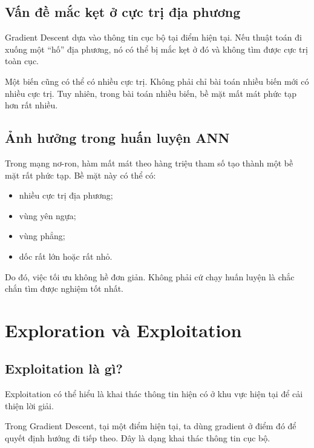 \documentclass[12pt,a4paper]{report}
\begin{document}
\section{Vấn đề mắc kẹt ở cực trị địa phương}

Gradient Descent dựa vào thông tin cục bộ tại điểm hiện tại. Nếu thuật toán đi xuống một ``hố'' địa phương, nó có thể bị mắc kẹt ở đó và không tìm được cực trị toàn cục.

\begin{luuy}
Một biến cũng có thể có nhiều cực trị. Không phải chỉ bài toán nhiều biến mới có nhiều cực trị. Tuy nhiên, trong bài toán nhiều biến, bề mặt mất mát phức tạp hơn rất nhiều.
\end{luuy}

\section{Ảnh hưởng trong huấn luyện ANN}

Trong mạng nơ-ron, hàm mất mát theo hàng triệu tham số tạo thành một bề mặt rất phức tạp. Bề mặt này có thể có:

\begin{itemize}
    \item nhiều cực trị địa phương;
    \item vùng yên ngựa;
    \item vùng phẳng;
    \item dốc rất lớn hoặc rất nhỏ.
\end{itemize}

Do đó, việc tối ưu không hề đơn giản. Không phải cứ chạy huấn luyện là chắc chắn tìm được nghiệm tốt nhất.

\chapter{Exploration và Exploitation}

\section{Exploitation là gì?}

Exploitation có thể hiểu là khai thác thông tin hiện có ở khu vực hiện tại để cải thiện lời giải.

Trong Gradient Descent, tại một điểm hiện tại, ta dùng gradient ở điểm đó để quyết định hướng đi tiếp theo. Đây là dạng khai thác thông tin cục bộ.
\end{document}
